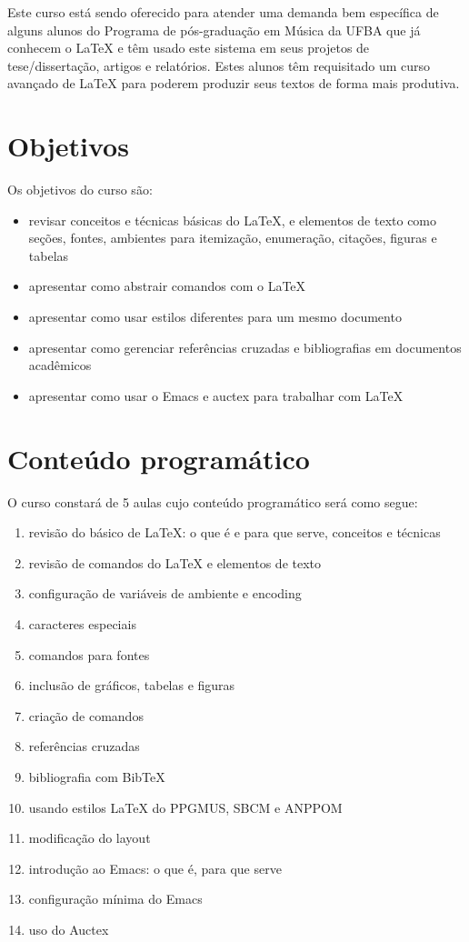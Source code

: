 \documentclass[12pt,brazil]{article}
\begin{document}
Este curso está sendo oferecido para atender uma demanda bem
específica de alguns alunos do Programa de pós-graduação em Música da
UFBA que já conhecem o \LaTeX{} e têm usado este sistema em seus
projetos de tese/dissertação, artigos e relatórios. Estes alunos têm
requisitado um curso avançado de \LaTeX{} para poderem produzir seus
textos de forma mais produtiva.

\section{Objetivos}

Os objetivos do curso são:

\begin{itemize}
\item revisar conceitos e técnicas básicas do \LaTeX, e elementos de
  texto como seções, fontes, ambientes para itemização, enumeração,
  citações, figuras e tabelas
\item apresentar como abstrair comandos com o \LaTeX
\item apresentar como usar estilos diferentes para um mesmo documento
\item apresentar como gerenciar referências cruzadas e bibliografias
  em documentos acadêmicos
\item apresentar como usar o Emacs e auctex para trabalhar com \LaTeX
\end{itemize}

\section{Conteúdo programático} 

O curso constará de 5 aulas cujo conteúdo programático será como
segue:

\begin{enumerate}
\item revisão do básico de \LaTeX: o que é e para que serve, conceitos
  e técnicas
\item revisão de comandos do LaTeX e elementos de texto
\item configuração de variáveis de ambiente e encoding
\item caracteres especiais
\item comandos para fontes
\item inclusão de gráficos, tabelas e figuras
\item criação de comandos
\item referências cruzadas
\item bibliografia com BibTeX
\item usando estilos \LaTeX{} do PPGMUS, SBCM e ANPPOM
\item modificação do layout
\item introdução ao Emacs: o que é, para que serve
\item configuração mínima do Emacs
\item uso do Auctex
\end{enumerate} 
\end{document}
